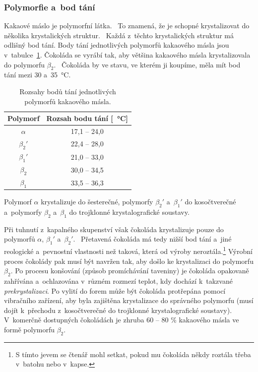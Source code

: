 \documentclass[12pt]{article}
\begin{document}
\subsubsection{Polymorfie a~bod tání}%
\label{sec:polymorfie}

Kakaové máslo je polymorfní látka.~\cite{Article:cocoa_butter_polymorphism} To znamená, že je schopné krystalizovat do několika krystalických struktur.~\cite{wiki:Polymorfie} Každá z~těchto krystalických struktur má odlišný bod tání. Body tání jednotlivých polymorfů kakaového másla jsou v~tabulce~\ref{tab:polymorfy}. Čokoláda se vyrábí tak, aby většina kakaového másla krystalizovala do polymorfu $\beta_2$.~\cite{Article:cocoa_butter_tempering} Čokoláda by ve stavu, ve kterém ji koupíme, měla mít bod tání mezi 30 a~\SI{35}{\degreeCelsius}.

\begin{table}
    \centering
    \begin{tabular}{|c|c|}
        \hline
        Polymorf & Rozsah bodu tání [\SI{}{\degreeCelsius}] \\\hline
        $\alpha$ & 17,1 -- 24,0\\
        $\beta_2'$ & 22,4 -- 28,0\\
        $\beta_1'$ & 21,0 -- 33,0\\
        $\beta_2$ & 30,0 -- 34,5\\
        $\beta_1$ & 33,5 -- 36,3\\
        \hline
    \end{tabular}
    \caption{Rozsahy bodů tání jednotlivých polymorfů kakaového másla.\cite{Article:cocoa_butter_polymorphism}}
    \label{tab:polymorfy}
\end{table}

Polymorf $\alpha$ krystalizuje do šesterečné, polymorfy $\beta_2'$ a~$\beta_1'$ do kosočtverečné a~polymorfy $\beta_2$ a~$\beta_1$ do trojklonné krystalografické soustavy.~\cite{Article:precrystallization}\cite{wiki:crystal_structure}
\par\noindent
Při tuhnutí z~kapalného skupenství však čokoláda krystalizuje pouze do polymorfů $\alpha$, $\beta_1'$ a~$\beta_2'$.~\cite{Article:molecular_polymorphism} Přetavená čokoláda má tedy nižší bod tání a~jiné reologické a~pevnostní vlastnosti než taková, která od výroby neroztála.\footnote{S tímto jevem se čtenář mohl setkat, pokud mu čokoláda někdy roztála třeba v~batohu nebo v~kapse.} Výrobní proces čokolády pak musí být navržen tak, aby došlo ke krystalizaci do polymorfu $\beta_2$. Po procesu konšování (způsob promíchávání taveniny) je čokoláda opakovaně zahřívána a~ochlazována v~různém rozmezí teplot, kdy dochází k~takzvané \emph{prekrystalizaci}. Po vylití do forem může být čokoláda protřepána pomocí vibračního zařízení, aby byla zajištěna krystalizace do správného polymorfu (musí dojít k~přechodu z~kosočtverečné do trojklonné krystalografické soustavy).~\cite{wiki:čokoláda}\cite{wiki:konšování}\cite{Article:viscosity_molten_milk_chocolate} V~komerčně dostupných čokoládách je zhruba 60 -- 80 \% kakaového másla ve formě polymorfu $\beta_2$.~\cite{Article:precrystallization}
\end{document}

